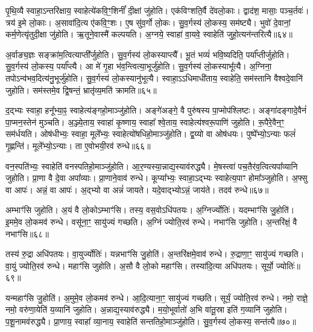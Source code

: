 पृ॒थि॒व्यै स्वाहा॒\-ऽन्तरि॑क्षाय॒ स्वाहेत्ये॑कवि॒ꣳ॒शिनीं᳚ दी॒क्षां जु॑होति।
एक॑विꣳशति॒र्वै दे॑वलो॒काः।
द्वाद॑श॒ मासाः॒ पञ्च॒र्तवः॑।
त्रय॑ इ॒मे लो॒काः।
अ॒सावा॑दि॒त्य ए॑कवि॒ꣳ॒शः।
ए॒ष सु॑व॒र्गो लो॒कः।
सु॒व॒र्गस्य॑ लो॒कस्य॒ सम॑ष्ट्यै।
भुवो॑ दे॒वानां॒ कर्म॒णेत्यृ॑तुदी॒क्षा जु॑होति।
ऋ॒तूने॒वास्मै॑ कल्पयति।
अ॒ग्नये॒ स्वाहा॑ वा॒यवे॒ स्वाहेति॑ जुहो॒त्यन॑न्तरित्यै॥६४॥

अ॒र्वाङ्य॒ज्ञः सङ्क्रा॑म॒त्वित्याप्ती᳚र्जुहोति।
सु॒व॒र्गस्य॑ लो॒कस्याप्त्यै᳚।
भू॒तं भव्यं॑ भवि॒ष्यदिति॒ पर्या᳚प्तीर्जुहोति।
सु॒व॒र्गस्य॑ लो॒कस्य॒ पर्या᳚प्त्यै।
आ मे॑ गृ॒हा भ॑व॒न्त्वित्या॒भूर्जु॑होति।
सु॒व॒र्गस्य॑ लो॒कस्याभू᳚त्यै।
अ॒ग्निना॒ तपो\-ऽन्व॑भव॒दित्य॑नु॒भूर्जु॑होति।
सु॒व॒र्गस्य॑ लो॒कस्यानु॑भूत्यै।
स्वाहा॒\-ऽऽधिमाधी॑ताय॒ स्वाहेति॒ सम॑स्तानि वैश्वदे॒वानि॑ जुहोति।
सम॑स्तमे॒व द्वि॒षन्तं॒ भ्रातृ॑व्य॒मति॑ क्रामति॥६५॥

द॒द्भ्यः स्वाहा॒ हनू᳚भ्या॒ꣴ॒ स्वाहेत्य॑ङ्गहो॒माञ्जु॑होति।
अङ्गे॑अङ्गे॒ वै पुरु॑षस्य पा॒प्मोप॑श्लिष्टः।
अङ्गा॑दङ्गादे॒वैनं॑ पा॒प्मन॒स्तेन॑ मुञ्चति।
अ॒ञ्ज्ये॒ताय॒ स्वाहा॑ कृ॒ष्णाय॒ स्वाहा᳚ श्वे॒ताय॒ स्वाहेत्य॑श्वरू॒पाणि॑ जुहोति।
रू॒पैरे॒वैन॒ꣳ॒ सम॑र्धयति।
ओष॑धीभ्यः॒ स्वाहा॒ मूले᳚भ्यः॒ स्वाहेत्यो॑षधिहो॒माञ्जु॑होति।
द्व॒य्यो वा ओष॑धयः।
पुष्पे᳚भ्यो॒\-ऽन्याः फलं॑ गृ॒ह्णन्ति॑।
मूले᳚भ्यो॒\-ऽन्याः।
ता ए॒वोभयी॒रव॑ रुन्धे॥६६॥

वन॒स्पति॑भ्यः॒ स्वाहेति॑ वनस्पतिहो॒माञ्जु॑होति।
आ॒र॒ण्यस्या॒\-न्नाद्य॒स्याव॑रुद्ध्यै।
मे॒षस्त्वा॑ पच॒तैर॑व॒त्वित्यपा᳚व्यानि जुहोति।
प्रा॒णा वै दे॒वा अपा᳚व्याः।
प्रा॒णाने॒वाव॑ रुन्धे।
कूप्या᳚भ्यः॒ स्वाहा॒ऽद्भ्यः स्वाहेत्य॒पाꣳ होमा᳚ञ्जुहोति।
अ॒फ्सु वा आपः॑।
अन्नं॒ वा आपः॑।
अ॒द्भ्यो वा अन्नं॑ जायते।
यदे॒वाद्भ्यो\-ऽन्नं॒ जाय॑ते।
तदव॑ रुन्धे॥६७॥\anuvakamend[पू॒र्व॒दी॒क्षा जु॑होति॒ पूर्व॑ ए॒व द्वि॒षन्तं॒ भ्रातृ॑व्य॒मति॑ क्राम॒त्यन॑न्तरित्यै क्रामति रुन्धे॒ जाय॑त॒ एकं॑ च]

अम्भाꣳ॑सि जुहोति।
अ॒यं वै लो॒को\-ऽम्भाꣳ॑सि।
तस्य॒ वस॒वो\-ऽधि॑पतयः।
अ॒ग्निर्ज्योतिः॑।
यदम्भाꣳ॑सि जु॒होति॑।
इ॒ममे॒व लो॒कमव॑ रुन्धे।
वसू॑ना॒ꣳ॒ सायु॑ज्यं गच्छति।
अ॒ग्निं ज्योति॒रव॑ रुन्धे।
नभाꣳ॑सि जुहोति।
अ॒न्तरि॑क्षं॒ वै नभाꣳ॑सि॥६८॥

तस्य॑ रु॒द्रा अधि॑पतयः।
वा॒युर्ज्योतिः॑।
यन्नभाꣳ॑सि जु॒होति॑।
अ॒न्तरि॑क्षमे॒वाव॑ रुन्धे।
रु॒द्राणा॒ꣳ॒ सायु॑ज्यं गच्छति।
वा॒युं ज्योति॒रव॑ रुन्धे।
महाꣳ॑सि जुहोति।
अ॒सौ वै लो॒को महाꣳ॑सि।
तस्या॑दि॒त्या अधि॑पतयः।
सूर्यो॒ ज्योतिः॑॥६९॥

यन्महाꣳ॑सि जु॒होति॑।
अ॒मुमे॒व लो॒कमव॑ रुन्धे।
आ॒दि॒त्याना॒ꣳ॒ सायु॑ज्यं गच्छति।
सूर्यं॒ ज्योति॒रव॑ रुन्धे।
नमो॒ राज्ञे॒ नमो॒ वरु॑णा॒येति॑ य॒व्यानि॑ जुहोति।
अ॒न्नाद्य॒स्याव॑रुद्ध्यै।
म॒यो॒भूर्वातो॑ अ॒भि वा॑तू॒स्रा इति॑ ग॒व्यानि॑ जुहोति।
प॒शू॒नामव॑रुद्ध्यै।
प्रा॒णाय॒ स्वाहा᳚ व्या॒नाय॒ स्वाहेति॑ सन्ततिहो॒माञ्जु॑होति।
सु॒व॒र्गस्य॑ लो॒कस्य॒ सन्त॑त्यै॥७०॥

